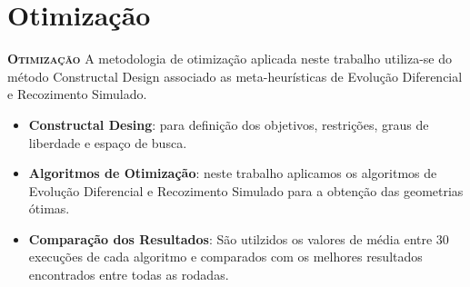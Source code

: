 \documentclass[xcolor=dvipsnames,10pt]{beamer}
\begin{document}
\section{Otimização}
\begin{frame}
	\begin{block}{\textbf{\textsc{Otimização}}}
	\justifying
	\setlength{\parindent}{1cm}
	A metodologia de otimização aplicada neste trabalho utiliza-se do método Constructal Design associado as meta-heurísticas de Evolução Diferencial e Recozimento Simulado. 
	\begin{itemize}
		\item \textbf{Constructal Desing}: para definição dos objetivos, restrições, graus de liberdade e espaço de busca.
		\item \textbf{Algoritmos de Otimização}: neste trabalho aplicamos os algoritmos de Evolução Diferencial e Recozimento Simulado  para a obtenção das geometrias ótimas.
		\item \textbf{Comparação dos Resultados}: São utilzidos os valores de média entre 30 execuções de cada algoritmo e comparados com os melhores resultados encontrados entre todas as rodadas.
	\end{itemize}
	\end{block}
\end{frame}
\end{document}
